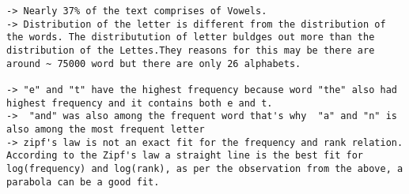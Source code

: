 \documentclass[11pt]{article}
\makeatletter
\newcommand{\boxspacing}{\kern\kvtcb@left@rule\kern\kvtcb@boxsep}
\newcommand{\prompt}[4]{
        \ttfamily\llap{{\color{#2}[#3]:\hspace{3pt}#4}}\vspace{-\baselineskip}
    }
\makeatother
\begin{document}
    \begin{verbatim}
-> Nearly 37% of the text comprises of Vowels.
-> Distribution of the letter is different from the distribution of the words. The distributution of letter buldges out more than the distribution of the Lettes.They reasons for this may be there are around ~ 75000 word but there are only 26 alphabets.

-> "e" and "t" have the highest frequency because word "the" also had highest frequency and it contains both e and t. 
->  "and" was also among the frequent word that's why  "a" and "n" is also among the most frequent letter
-> zipf's law is not an exact fit for the frequency and rank relation. According to the Zipf's law a straight line is the best fit for log(frequency) and log(rank), as per the observation from the above, a parabola can be a good fit.  
\end{verbatim}

    \begin{tcolorbox}[breakable, size=fbox, boxrule=1pt, pad at break*=1mm,colback=cellbackground, colframe=cellborder]
\prompt{In}{incolor}{ }{\boxspacing}
\begin{Verbatim}[commandchars=\\\{\}]

\end{Verbatim}
\end{tcolorbox}


    
    
    
\end{document}
